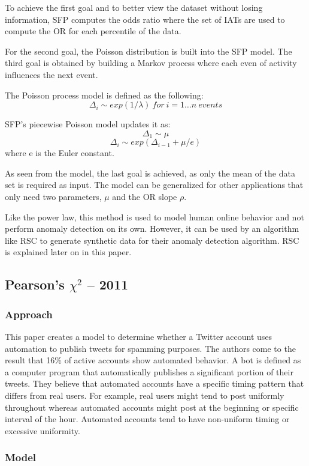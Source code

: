 \documentclass[11pt, oneside]{article}   	%
\begin{document}
To achieve the first goal and to better view the dataset without losing information, SFP computes the odds ratio where the set of IATs are used to compute the OR for each percentile of the data.

For the second goal, the Poisson distribution is built into the SFP model.
The third goal is obtained by building a Markov process where each even of activity influences the next event.

The Poisson process model is defined as the following:
$$ \Delta_i \sim exp(1/ \lambda) \ for \ i = 1 \dots n \ events $$

SFP's piecewise Poisson model updates it as:
$$ \Delta_1 \sim \mu $$
$$ \Delta_i \sim exp(\Delta_{i-1} + \mu / e) $$
where e is the Euler constant.

As seen from the model, the last goal is achieved, as only the mean of the data set is required as input.
The model can be generalized for other applications that only need two parameters, $\mu$ and the OR slope $\rho$.

\quad Like the power law, this method is used to model human online behavior and not perform anomaly detection on its own. However, it can be used by an algorithm like RSC \cite{rsc} to generate synthetic data for their anomaly detection algorithm. RSC is explained later on in this paper.

\subsection*{Pearson's $\chi^2$ -- 2011}

\subsubsection*{Approach}

\quad This paper creates a model to determine whether a Twitter account uses automation to publish tweets for spamming purposes. 
The authors come to the result that 16\% of active accounts show automated behavior.
A bot is defined as a computer program that automatically publishes a significant portion of their tweets.
They believe that automated accounts have a specific timing pattern that differs from real users.
For example, real users might tend to post uniformly throughout whereas automated accounts might post at the beginning or specific interval of the hour.
Automated accounts tend to have non-uniform timing or excessive uniformity.

\subsubsection*{Model}
\end{document}

